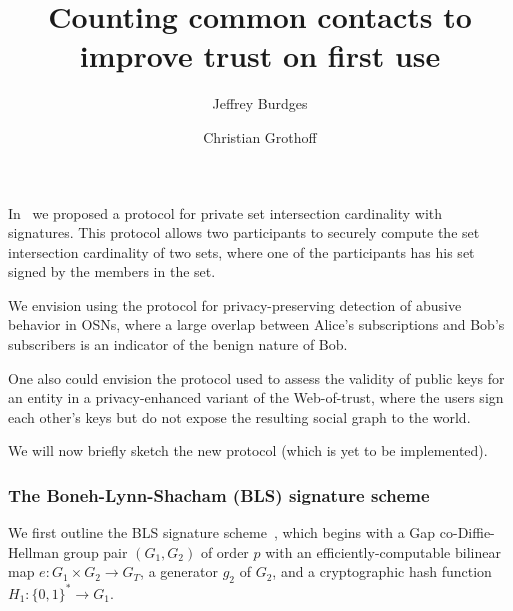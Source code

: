 \documentclass{article}
\title{Counting common contacts to improve trust on first use}
\author{Jeffrey Burdges \and Christian Grothoff}
\begin{document}
\maketitle


\def\Z{\mathbb{Z}}

\newcommand*\set[1]{\{ #1 \}} %
\newcommand*\Set[1]{\left\{ #1 \right\}}
\newcommand*\setst[2]{\{ #1 | #2 \}}
\newcommand*\Setst[2]%
        {\left\{\,#1\vphantom{#2} \;\right|\left. #2 \vphantom{#1}\,\right\}}

\newcommand*\List[1]{\left[ #1 \right]}  %
\newcommand*\listst[2]{[ #1 | #2 ]}
\newcommand*\Listst[2]%
        {\left[\,#1\vphantom{#2} \;\right|\left. #2 \vphantom{#1}\,\right]}

\def\Alice{{\textrm{Alice}}}
\def\Bob{{\textrm{Bob}}}

\def\mathcomma{,}
\def\mathperiod{.}


In~\cite{p4t} we proposed a protocol for private set intersection
cardinality with signatures.  This protocol allows two participants
to securely compute the set intersection cardinality of two sets,
where one of the participants has his set signed by the members
in the set.

We envision using the protocol for privacy-preserving detection of
abusive behavior in OSNs, where a large overlap between Alice's
subscriptions and Bob's subscribers is an indicator of
the benign nature of Bob.

One also could envision the protocol used to assess the validity of
public keys for an entity in a privacy-enhanced variant of the
Web-of-trust, where the users sign each other's keys but do not expose
the resulting social graph to the world.

We will now briefly sketch the new protocol (which is yet to be
implemented).

\subsubsection{The Boneh-Lynn-Shacham (BLS) signature scheme}

We first outline the BLS signature scheme~\cite{BLS-SigWeilPairing},
which begins with a Gap co-Diffie-Hellman group pair $(G_1, G_2)$ of order $p$
with an efficiently-computable bilinear map $e\colon G_1\times G_2 \to G_T$,
 a generator $g_2$ of $G_2$,
 and a cryptographic hash function $H_1 : \{0,1\}^* \to G_1$.
\end{document}
